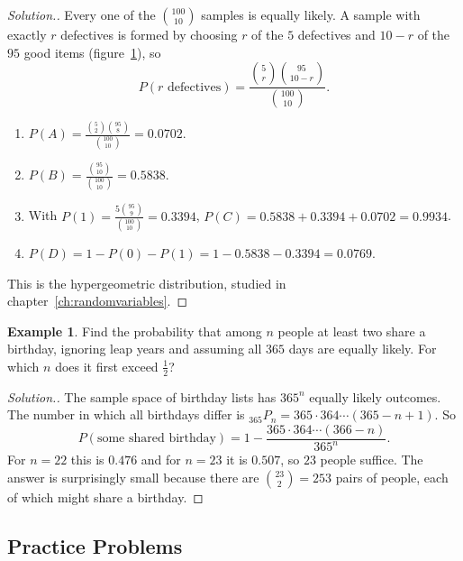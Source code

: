 \documentclass[12pt,a4paper]{report}
\theoremstyle{definition}
\newtheorem{example}[thm]{Example}
\theoremstyle{plain}
\theoremstyle{definition}
\newenvironment{solution}
  {\renewcommand{\qedsymbol}{}\begin{proof}[\textit{Solution}.]}
  {\end{proof}}
\begin{document}
\begin{solution}
Every one of the $\binom{100}{10}$ samples is equally likely. A sample with exactly $r$
defectives is formed by choosing $r$ of the $5$ defectives and $10 - r$ of the $95$ good
items (figure~\ref{fig:lot}), so
\[P(r\text{ defectives}) = \frac{\binom5r\binom{95}{10 - r}}{\binom{100}{10}} .\]
\begin{enumerate}
\item[(A)] $P(A) = \frac{\binom52\binom{95}{8}}{\binom{100}{10}} = 0.0702$.
\item[(B)] $P(B) = \frac{\binom{95}{10}}{\binom{100}{10}} = 0.5838$.
\item[(C)] With $P(1) = \frac{5\binom{95}{9}}{\binom{100}{10}} = 0.3394$,
$P(C) = 0.5838 + 0.3394 + 0.0702 = 0.9934$.
\item[(D)] $P(D) = 1 - P(0) - P(1) = 1 - 0.5838 - 0.3394 = 0.0769$.
\end{enumerate}
This is the hypergeometric distribution, studied in chapter~\ref{ch:randomvariables}.
\end{solution}

\begin{figure}[H]
\centering
{}
\label{fig:lot}
\end{figure}

\begin{example}
\label{ex:birthday}
Find the probability that among $n$ people at least two share a birthday, ignoring
leap years and assuming all $365$ days are equally likely. For which $n$ does it first
exceed $\frac12$?
\end{example}

\begin{solution}
The sample space of birthday lists has $365^n$ equally likely outcomes. The number in
which all birthdays differ is ${}_{365}P_n = 365\cdot 364\cdots(365 - n + 1)$. So
\[P(\text{some shared birthday}) = 1 - \frac{365\cdot 364\cdots(366 - n)}{365^n} .\]
For $n = 22$ this is $0.476$ and for $n = 23$ it is $0.507$, so $23$ people suffice. The
answer is surprisingly small because there are $\binom{23}{2} = 253$ pairs of people,
each of which might share a birthday.
\end{solution}

\subsection{Practice Problems}
\end{document}
